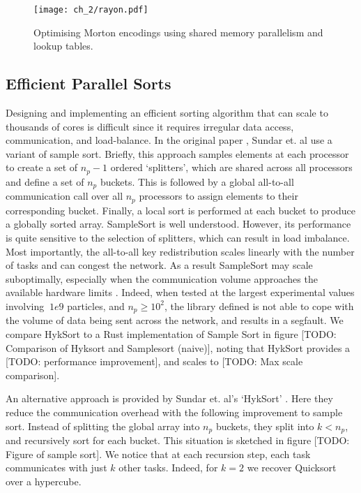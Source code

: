 \begin{figure}
    \centerline{\texttt{[image: ch\_2/rayon.pdf]}}
    \caption{Optimising Morton encodings using shared memory parallelism and lookup tables.}
    \label{fig:sec_2_4:rayon}
\end{figure}


\subsection*{Efficient Parallel Sorts}

Designing and implementing an efficient sorting algorithm that can scale to thousands of cores is difficult since it requires irregular data access, communication, and load-balance. In the original paper \cite{sundar2008bottom}, Sundar et. al use a variant of sample sort. Briefly, this approach samples elements at each processor to create a set of $n_p - 1 $ ordered `splitters', which are shared across all processors and define a set of $n_p$ buckets. This is followed by a global all-to-all communication call over all $n_p$ processors to assign elements to their corresponding bucket. Finally, a local sort is performed at each bucket to produce a globally sorted array. SampleSort is well understood. However, its performance is quite sensitive to the selection of splitters, which can result in load imbalance. Most importantly, the all-to-all key redistribution scales linearly with the number of tasks and can congest the network. As a result SampleSort may scale suboptimally, especially when the communication volume approaches the available hardware limits \cite{sundar2013hyksort}. Indeed, when tested at the largest experimental values involving $~1e9$ particles, and $n_p \geq 10^2$, the library defined  is not able to cope with the volume of data being sent across the network, and results in a segfault. We compare HykSort to a Rust implementation of Sample Sort in figure [TODO: Comparison of Hyksort and Samplesort (naive)], noting that HykSort provides a [TODO: performance improvement], and scales to [TODO: Max scale comparison].

An alternative approach is provided by Sundar et. al's `HykSort' \cite{sundar2013hyksort}. Here they reduce the communication overhead with the following improvement to sample sort. Instead of splitting the global array into $n_p$ buckets, they split into $k < n_p$, and recursively sort for each bucket. This situation is sketched in figure [TODO: Figure of sample sort]. We notice that at each recursion step, each task communicates with just $k$ other tasks. Indeed, for $k=2$ we recover Quicksort over a hypercube. 


